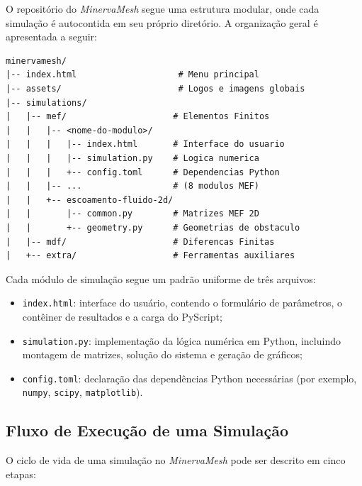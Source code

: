 O repositório do \textit{MinervaMesh} segue uma estrutura modular, onde cada simulação é autocontida em seu próprio diretório. A organização geral é apresentada a seguir:

\begin{lstlisting}[style=dirstyle,numbers=none]
minervamesh/
|-- index.html                    # Menu principal
|-- assets/                       # Logos e imagens globais
|-- simulations/
|   |-- mef/                     # Elementos Finitos
|   |   |-- <nome-do-modulo>/
|   |   |   |-- index.html       # Interface do usuario
|   |   |   |-- simulation.py    # Logica numerica
|   |   |   +-- config.toml      # Dependencias Python
|   |   |-- ...                  # (8 modulos MEF)
|   |   +-- escoamento-fluido-2d/
|   |       |-- common.py        # Matrizes MEF 2D
|   |       +-- geometry.py      # Geometrias de obstaculo
|   |-- mdf/                     # Diferencas Finitas
|   +-- extra/                   # Ferramentas auxiliares
\end{lstlisting}

Cada módulo de simulação segue um padrão uniforme de três arquivos:
\begin{itemize}
    \item \texttt{index.html}: interface do usuário, contendo o formulário de parâmetros, o contêiner de resultados e a carga do PyScript;
    \item \texttt{simulation.py}: implementação da lógica numérica em Python, incluindo montagem de matrizes, solução do sistema e geração de gráficos;
    \item \texttt{config.toml}: declaração das dependências Python necessárias (por exemplo, \texttt{numpy}, \texttt{scipy}, \texttt{matplotlib}).
\end{itemize}

\subsection{Fluxo de Execução de uma Simulação}
\label{sec:fluxo_execucao}

O ciclo de vida de uma simulação no \textit{MinervaMesh} pode ser descrito em cinco etapas:

